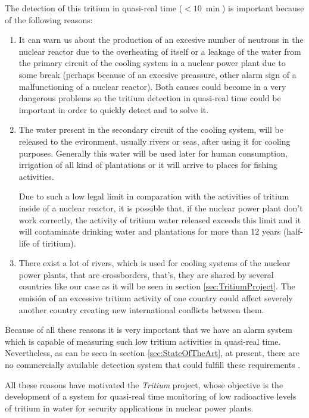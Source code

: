 The detection of this tritium in quasi-real time ($<10~\min$) is important because of the following reasons:

\begin{enumerate}

\item{} It can warn us about the production of an excesive number of neutrons in the nuclear reactor due to the overheating of itself or a leakage of the water from the primary circuit of the cooling system in a nuclear power plant due to some break (perhaps because of an excesive preassure, other alarm sign of a malfunctioning of a nuclear reactor). Both causes could become in a very dangerous problems so the tritium detection in quasi-real time could be important in order to quickly detect and to solve it.

\item{} The water present in the secondary circuit of the cooling system, will be released to the evironment, usually rivers or seas, after using it for cooling purposes. Generally this water will be used later for human consumption, irrigation of all kind of plantations or it will arrive to places for fishing activities. 

Due to such a low legal limit in comparation with the activities of tritium inside of a nuclear reactor, it is possible that, if the nuclear power plant don't work correctly, the activity of tritium water released exceeds this limit and it will contaminate drinking water and plantations for more than 12 years (half-life of tiritium).


\item{} There exist a lot of rivers, which is used for cooling systems of the nuclear power plants, that are crossborders, that's, they are shared by several countries like our case as it will be seen in section \ref{sec:TritiumProject}. The emisión of an excessive tritium activity of one country could affect severely another country creating new international conflicts between them.

\end{enumerate}

Because of all these reasons it is very important that we have an alarm system which is capable of measuring such low tritium activities in quasi-real time. Nevertheless, as can be seen in section \ref{sec:StateOfTheArt}, at present, there are no commercially available detection system that could fulfill these requirements .

All these reasons have motivated the \textit{Tritium} project, whose objective is the development of a system for quasi-real time monitoring of low radioactive levels of tritium in water for security applications in nuclear power plants.